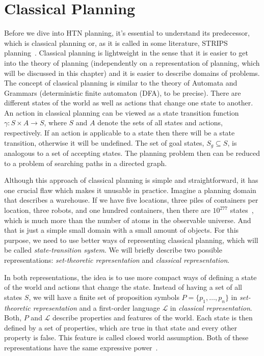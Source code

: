 \chapter{Classical {P}lanning}

\medskip\noindent
Before we dive into HTN planning, it's essential to understand its predecessor, which is classical planning or, as it is called in some literature, STRIPS planning~\cite{strips}. Classical planning is lightweight in the sense that it is easier to get into the theory of planning (independently on a representation of planning, which will be discussed in this chapter) and it is easier to describe domains of problems. The concept of classical planning is similar to the theory of Automata and Grammars (deterministic finite automaton (DFA), to be precise). There are different states of the world as well as actions that change one state to another. An action in classical planning can be viewed as a state transition function $\gamma: S \times A \rightarrow S$, where $S$ and $A$ denote the sets of all states and actions, respectively. If an action is applicable to a state then there will be a state transition, otherwise it will be undefined. The set of goal states, $S_g \subseteq S$, is analogous to a set of accepting states. The planning problem then can be reduced to a problem of searching paths in a directed graph.

\medskip\noindent
Although this approach of classical planning is simple and straightforward, it has one crucial flaw which makes it unusable in practice. Imagine a planning domain that describes a warehouse. If we have five locations, three piles of containers per location, three robots, and one hundred containers, then there are $10^{277}$ states~\cite{nau}, which is much more than the number of atoms in the observable universe. And that is just a simple small domain with a small amount of objects. For this purpose, we need to use better ways of representing classical planning, which will be called \emph{state-transition system}. We will briefly describe two possible representations: \emph{set-theoretic representation} and \emph{classical representation}.

\medskip\noindent
In both representations, the idea is to use more compact ways of defining a state of the world and actions that change the state. Instead of having a set of all states $S$, we will have a finite set of proposition symbols $P = \{p_1,\dots,p_n\}$ in \emph{set-theoretic representation} and a first-order language $\mathcal{L}$ in \emph{classical representation}. Both, $P$ and $\mathcal{L}$ describe properties and features of the world. Each state is then defined by a set of properties, which are true in that state and every other property is false. This feature is called closed world assumption. Both of these representations have the same expressive power~\cite{nau}. 

